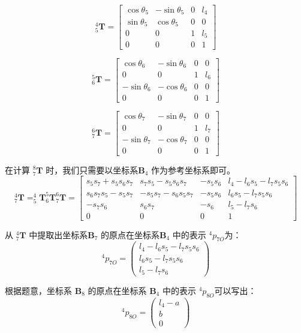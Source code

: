 \documentclass{homework}
\begin{document}
\begin{sol}
\[
  _5^4\mathbf{T} =
  \begin{bmatrix}
    \cos\theta_5 & -\sin\theta_5 & 0 & l_4 \\
    \sin\theta_5 & \cos\theta_5 & 0 & 0 \\
    0 & 0 & 1 & l_5 \\
    0 & 0 & 0 & 1
  \end{bmatrix}
\]

\[
  _6^5\mathbf{T} =
  \begin{bmatrix}
    \cos\theta_6 & -\sin\theta_6 & 0 & 0 \\
    0 & 0 & 1 & l_6 \\
    -\sin\theta_6 & -\cos\theta_6 & 0 & 0 \\
    0 & 0 & 0 & 1
  \end{bmatrix}
\]

\[
  _7^6\mathbf{T} =
  \begin{bmatrix}
    \cos\theta_7 & -\sin\theta_7 & 0 & 0 \\
    0 & 0 & 1 & l_7 \\
    -\sin\theta_7 & -\cos\theta_7 & 0 & 0 \\
    0 & 0 & 0 & 1
  \end{bmatrix}
\]

在计算 $ _7^8\mathbf{T} $ 时，我们只需要以坐标系{$ \mathbf{B}_4 $ }作为参考坐标系即可。
\[
  _7^4\mathbf{T} = _5^4\mathbf{T} _6^5\mathbf{T} _7^6\mathbf{T} =
  \begin{bmatrix} 
    s_{5}s_{7} + s_{5}s_{6}s_{7} & s_{7}s_{5} - s_{5}s_{6}s_{7} & -s_{5}s_{6} & l_4 - l_6s_{5} - l_7s_{5}s_{6} \\ 
    s_{6}s_{7}s_{5} - s_{5}s_{7} & -s_{5}s_{7} - s_{6}s_{5}s_{7} & -s_{5}s_{6} & l_6s_{5} - l_7s_{5}s_{6} \\ 
    -s_{7}s_{6} & s_{6}s_{7} & -s_{6} & l_5 - l_7s_{6} \\ 
    0 & 0 & 0 & 1
  \end{bmatrix}
\]

从 $ _7^4\mathbf{T} $ 中提取出坐标系{$ \mathbf{B}_7 $ }的原点在坐标系{$ \mathbf{B}_4 $ }中的表示 $ ^{4}p_{7O} $为：
\[
  ^{4}p_{7O} = 
  \begin{pmatrix}
    l_4 - l_6s_{5} - l_7s_{5}s_{6} \\
    l_6s_{5} - l_7s_{5}s_{6} \\
    l_5 - l_7s_{6}
  \end{pmatrix}
\]

根据题意，坐标系{ $ \mathbf{B}_8 $ }的原点在坐标系{ $ \mathbf{B}_4 $ }中的表示 $ ^{4}p_{8O} $可以写出：
\[
  ^{4}p_{8O} = 
  \begin{pmatrix}
    l_4 - a \\
    b \\
    0
  \end{pmatrix}
\]


\end{sol}
\end{document}
